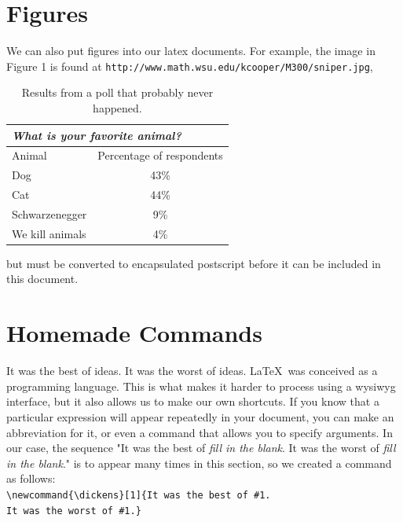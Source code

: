 \documentclass[12pt]{article}
\begin{document}
\section{Figures}

We can also put figures into our latex documents. For example, the image in
Figure 1 is found at \verb|http://www.math.wsu.edu/kcooper/M300/sniper.jpg|,

\newpage
\begin{table}
	\begin{center}

\caption{Results from a poll that probably never happened.}
	\begin{tabular}{ ||l|c|| } 
		\hline
		\multicolumn{2}{||l||}{{\it  What is your favorite animal?}}\\
		\hline
		Animal & Percentage of respondents\\
		\hline
		Dog & 43\% \\
		Cat &	44\% \\
		Schwarzenegger & 9\% \\
		We kill animals &	4\% \\
		\hline \hline
	\end{tabular}
\end{center}
\label{table:1}
\end{table}



\noindent but must be converted to encapsulated postscript before it can be included
in this document.

\section{Homemade Commands}

It was the best of ideas. It was the worst of ideas. \LaTeX\ was conceived as
a programming language. This is what makes it harder to process using a
wysiwyg interface, but it also allows us to make our own shortcuts. If you
know that a particular expression will appear repeatedly in your document,
you can make an abbreviation for it, or even a command that allows you to
specify arguments. In our case, the sequence "It was the best of {\it fill in the
blank}. It was the worst of {\it fill in the blank}." is to appear many times in this
section, so we created a command as follows:\\

\noindent
\verb|\newcommand{\dickens}[1]{It was the best of #1.|\\
\verb|It was the worst of #1.}|\\
	
\end{document}
